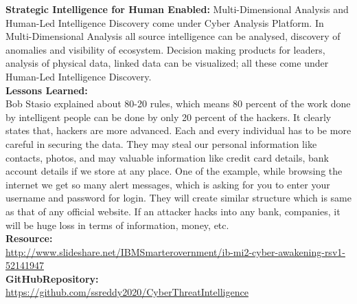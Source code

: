 \documentclass{article}
\begin{document}
\textbf{Strategic Intelligence for Human Enabled:}
Multi-Dimensional Analysis and Human-Led Intelligence Discovery come under Cyber Analysis Platform. In Multi-Dimensional Analysis all source intelligence can be analysed, discovery of anomalies and visibility of ecosystem.  Decision making products for leaders, analysis of physical data, linked data can be visualized; all these come under Human-Led Intelligence Discovery.\\


\textbf{Lessons Learned:}\\
Bob Stasio explained about 80-20 rules, which means 80 percent of the work done by intelligent people can be done by only 20 percent of the hackers. It clearly states that, hackers are more advanced. 
Each and every individual has to be more careful in securing the data. They may steal our personal information like contacts, photos, and may valuable information like credit card details, bank account details if we store at any place. One of the example, while browsing the internet we get so many alert messages, which is asking for you to enter your username and password for login.  They will create similar structure which is same as that of any official website. If an attacker hacks into any bank, companies, it will be huge loss in terms of information, money, etc.\\

\textbf{Resource:}\\
 \url { http://www.slideshare.net/IBMSmarterovernment/ib-mi2-cyber-awakening-rsv1-52141947}\\


\textbf{GitHubRepository:}\\
\url{https://github.com/ssreddy2020/CyberThreatIntelligence}
\end{document}
